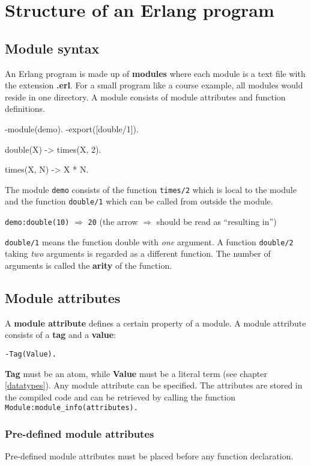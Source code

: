 \chapter{Structure of an Erlang program}

\section{Module syntax}

An Erlang program is made up of \textbf{modules} where each module is
a text file with the extension \textbf{.erl}. For a small program like
a course example, all modules would reside in one directory. A module
consists of module attributes and function definitions.

\begin{erlang}
-module(demo).
-export([double/1]).

double(X) -> times(X, 2).

times(X, N) -> X * N.
\end{erlang}

The module \texttt{demo} consists of the function \texttt{times/2}
which is local to the module and the function \texttt{double/1} which
can be called from outside the module.

\texttt{demo:double(10)} $\Rightarrow$ \texttt{20}
(the arrow $\Rightarrow$ should be read as ``resulting in'')

\texttt{double/1} means the function double with \textit{one}
argument. A function \texttt{double/2} taking \textit{two} arguments
is regarded as a different function. The number of arguments is called
the \textbf{arity} of the function.


\section{Module attributes}
A \textbf{module attribute} defines a certain property of a module. A
module attribute consists of a \textbf{tag} and a \textbf{value}:

\texttt{-Tag(Value).}

\textbf{Tag} must be an atom, while \textbf{Value} must be a literal
term (see chapter \ref{datatypes}). Any module attribute can be specified. The
attributes are stored in the compiled code and can be retrieved by
calling the function \texttt{Module:module\_info(attributes).}

\subsection{Pre-defined module attributes}
Pre-defined module attributes must be placed before any function
declaration.

